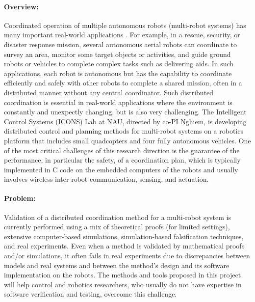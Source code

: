 
\paragraph{Overview:}

Coordinated operation of multiple autonomous robots (multi-robot systems) has many important real-world applications \cite{multirobot2005,multirobotsurvey2013}.
For example, in a rescue, security, or disaster response mission, several autonomous aerial robots can coordinate to survey an area, monitor some target objects or activities, and guide ground robots or vehicles to complete complex tasks such as delivering aids.
In such applications, each robot is autonomous but has the capability to coordinate efficiently and safely with other robots to complete a shared mission, often in a distributed manner without any central coordinator.
Such distributed coordination is essential in real-world applications where the environment is constantly and unexpectly changing, but is also very challenging.
The Intelligent Control Systems (ICONS) Lab at NAU, directed by co-PI Nghiem, is developing distributed control and planning methods for multi-robot systems on a robotics platform that includes small quadcopters and four fully autonomous vehicles.
One of the most critical challenges of this research direction is the guarantee of the performance, in particular the safety, of a coordination plan, which is typically implemented in C code on the embedded computers of the robots and usually involves wireless inter-robot communication, sensing, and actuation.

\paragraph{Problem:}

Validation of a distributed coordination method for a multi-robot system is currently performed using a mix of theoretical proofs (for limited settings), extensive computer-based simulations, simulation-based falsification techniques, and real experiments.
Even when a method is validated by mathematical proofs and/or simulations, it often fails in real experiments due to discrepancies between models and real systems and between the method's design and its software implementation on the robots.
The methods and tools proposed in this project will help control and robotics researchers, who usually do not have expertise in software verification and testing, overcome this challenge.


